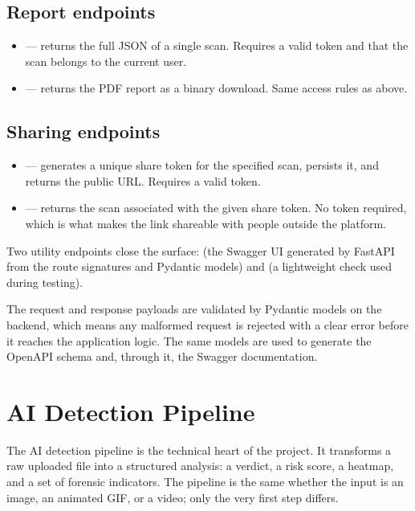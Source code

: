 \subsection*{Report endpoints}
\begin{itemize}
\item {} --- returns the full JSON of a single scan. Requires a valid token and that the scan belongs to the current user.
\item {} --- returns the PDF report as a binary download. Same access rules as above.
\end{itemize}

\subsection*{Sharing endpoints}
\begin{itemize}
\item {} --- generates a unique share token for the specified scan, persists it, and returns the public URL. Requires a valid token.
\item {} --- returns the scan associated with the given share token. No token required, which is what makes the link shareable with people outside the platform.
\end{itemize}

Two utility endpoints close the surface:  (the Swagger UI generated by FastAPI from the route signatures and Pydantic models) and  (a lightweight check used during testing).

The request and response payloads are validated by Pydantic models on the backend, which means any malformed request is rejected with a clear error before it reaches the application logic. The same models are used to generate the OpenAPI schema and, through it, the Swagger documentation.

\section{AI Detection Pipeline}

The AI detection pipeline is the technical heart of the project. It transforms a raw uploaded file into a structured analysis: a verdict, a risk score, a heatmap, and a set of forensic indicators. The pipeline is the same whether the input is an image, an animated GIF, or a video; only the very first step differs.


